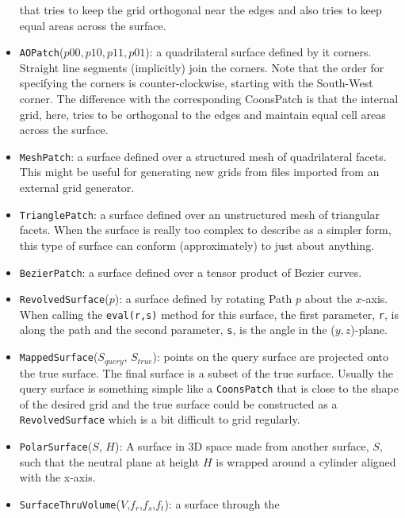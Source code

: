 \begin{itemize}
  that tries to keep the grid orthogonal near the edges and 
  also tries to keep equal areas across the surface.
\item \texttt{AOPatch}($p00, p10, p11, p01$): a quadrilateral surface defined by it corners.
  Straight line segments (implicitly) join the corners.
  Note that the order for specifying the corners is counter-clockwise,
  starting with the South-West corner.
  The difference with the corresponding CoonsPatch is that the internal grid, here,
  tries to be orthogonal to the edges and maintain
  equal cell areas across the surface.
\item \texttt{MeshPatch}: a surface defined over a structured mesh of
  quadrilateral facets.
  This might be useful for generating new grids from files imported from
  an external grid generator.
\item \texttt{TrianglePatch}: a surface defined over an unstructured mesh of
  triangular facets.
  When the surface is really too complex to describe as a simpler form,
  this type of surface can conform (approximately) to just about anything.
\item \texttt{BezierPatch}: a surface defined over a tensor product of Bezier curves. 
\item \texttt{RevolvedSurface}($p$): a surface defined by rotating Path $p$
  about the $x$-axis.
  When calling the \texttt{eval(r,s)} method for this surface, 
  the first parameter, \texttt{r}, is along the path and the second parameter, 
  \texttt{s}, is the angle in the ($y,z$)-plane.
\item \texttt{MappedSurface}($S_{query}$, $S_{true}$): points on the
  query surface are projected onto the true surface.
  The final surface is a subset of the true surface.
  Usually the query surface is something simple like a \texttt{CoonsPatch}
  that is close to the shape of the desired grid and
  the true surface could be constructed as a \texttt{RevolvedSurface} which is
  a bit difficult to grid regularly.
\item \texttt{PolarSurface}($S$, $H$): A surface in 3D space made from another surface, $S$,
  such that the neutral plane at height $H$ is wrapped around a cylinder aligned with
  the x-axis.
\item \texttt{SurfaceThruVolume}($V$,$f_r$,$f_s$,$f_t$): a surface through the

\end{itemize}
